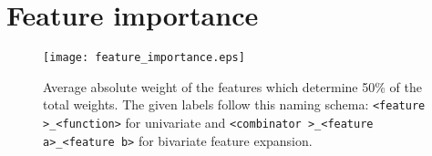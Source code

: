 \documentclass[a4paper, 10pt, conference]{ieeeconf}      %
\begin{document}
\chapter{Feature importance}

\begin{figure}[thpb]
  \centering
  \texttt{[image: feature\_importance.eps]}
  \parbox{\textwidth}{
    \caption{Average absolute weight of the features which determine 50\% of the total weights. The given labels follow this naming schema: \texttt{\textless feature \textgreater\_\textless function\textgreater} for univariate and \texttt{\textless combinator \textgreater \_\textless feature a\textgreater\_\textless feature b\textgreater} for bivariate feature expansion.}}
  \label{feature_importance}
\end{figure}

\end{document}
